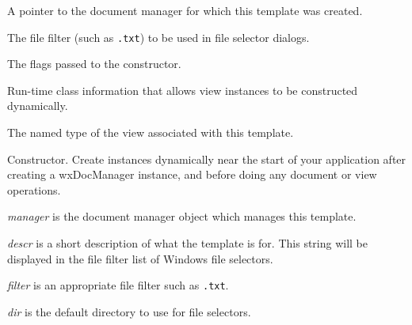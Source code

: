 
A pointer to the document manager for which this template was created.

\label{wxdoctemplatemfilefilter}


The file filter (such as {\tt *.txt}) to be used in file selector dialogs.

\label{wxdoctemplatemflags}


The flags passed to the constructor.

\label{wxdoctemplatemviewclassinfo}


Run-time class information that allows view instances to be constructed dynamically.

\label{wxdoctemplatemviewtypename}


The named type of the view associated with this template.

\label{wxdoctemplatector}


Constructor. Create instances dynamically near the start of your application after creating
a wxDocManager instance, and before doing any document or view operations.

{\it manager} is the document manager object which manages this template.

{\it descr} is a short description of what the template is for. This string will be displayed in the
file filter list of Windows file selectors.

{\it filter} is an appropriate file filter such as {\tt *.txt}.

{\it dir} is the default directory to use for file selectors.


